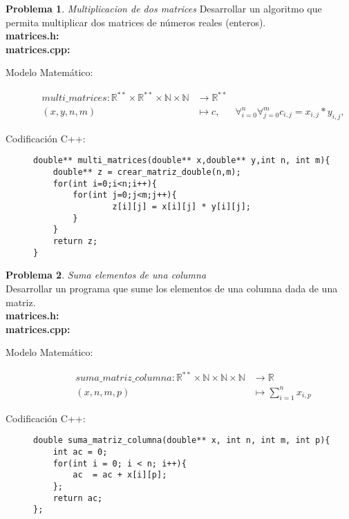 \documentclass{article}
\theoremstyle{plain}
\theoremstyle{definition}
\newtheorem{problem}{Problema}
\begin{document}
\begin{problem} \emph{Multiplicacion de dos matrices}
Desarrollar un algoritmo que permita multiplicar dos matrices de números reales (enteros).\\
\textbf{matrices.h:}\ \\
\textbf{matrices.cpp:}\ 
%
\begin{description}
\item[Modelo Matemático:]
%
\begin{align*}
multi\_matrices: \mathbb{R}^{**}\times\mathbb{R}^{**}\times\mathbb{N}\times\mathbb{N} &\to \mathbb{R}^{**}\\
(x,y,n,m) &\mapsto c,& \forall_{i=0}^{n}\forall_{j=0}^{m} c_{i,j} = x_{i,j} * y_{i,j},
\end{align*}
%
\item[Codificación \textsf{C++}:]\hfill
%
\begin{verbatim}
double** multi_matrices(double** x,double** y,int n, int m){
    double** z = crear_matriz_double(n,m);
    for(int i=0;i<n;i++){
        for(int j=0;j<m;j++){
                z[i][j] = x[i][j] * y[i][j];
        }
    }
    return z;
}
\end{verbatim}
\end{description}
\end{problem}

\begin{problem} \emph{Suma elementos de una columna}\\
Desarrollar un programa que sume los elementos de una columna dada de una matriz.\\
\textbf{matrices.h:}\ \\
\textbf{matrices.cpp:}\ 
%
\begin{description}
\item[Modelo Matemático:]
%
\begin{align*}
suma\_matriz\_columna: \mathbb{R}^{**}\times\mathbb{N}\times\mathbb{N}\times\mathbb{N} &\to \mathbb{R}\\
(x,n,m,p) &\mapsto \sum_{i=1}^{n} x_{i,p}
\end{align*}
%
\item[Codificación \textsf{C++}:]\hfill
%
\begin{verbatim}
double suma_matriz_columna(double** x, int n, int m, int p){
    int ac = 0;
    for(int i = 0; i < n; i++){
        ac  = ac + x[i][p];
    };
    return ac;
};
\end{verbatim}
\end{description}
\end{problem}
\end{document}
